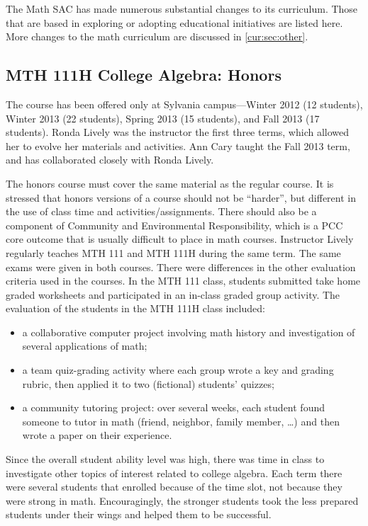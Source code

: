 The Math SAC has made numerous substantial changes to its curriculum. Those
that are based in exploring or adopting educational initiatives are listed here. More
changes to the math curriculum are discussed in \vref{cur:sec:other}.

\subsection{MTH 111H College Algebra: Honors}\label{cur:sub:111H}

The course has been offered only at Sylvania campus---Winter 2012 (12
students), Winter 2013 (22 students), Spring 2013 (15 students), and Fall 2013
(17 students).  Ronda Lively was the instructor the first three terms, which
allowed her to evolve her materials and activities.  Ann Cary taught the
Fall 2013 term, and has collaborated closely with Ronda Lively.

The honors course must cover the same material as the regular course. It
is stressed that honors versions of a course should not be ``harder'', but
different in the use of class time and activities/assignments.  There should
also be a component of Community and Environmental Responsibility, which is a
PCC core outcome that is usually difficult to place in math courses.  Instructor
Lively regularly teaches MTH 111 and MTH 111H during the same term.  The same
exams were given in both courses.  There were differences in the other evaluation
criteria used in the courses.  In the MTH 111 class, students submitted take
home graded worksheets and participated in an in-class graded group activity.
The evaluation of the students in the MTH 111H class included:
\begin{itemize}
	\item a collaborative computer project involving math history and investigation
	of several applications of math;
	\item a team quiz-grading activity where each group wrote a key and grading
	rubric, then applied it to two (fictional) students' quizzes;
	\item a community tutoring project:  over several weeks, each student found someone to
	tutor in math (friend, neighbor, family member, \ldots) and then wrote a paper
	on their experience.
\end{itemize}
Since the overall student ability level was high, there was time in class to
investigate other topics of interest related to college algebra.  Each term
there were several students that enrolled because of the time slot,
not because they were strong in math.  Encouragingly, the
stronger students took the less prepared students under their wings and helped
them to be successful.

